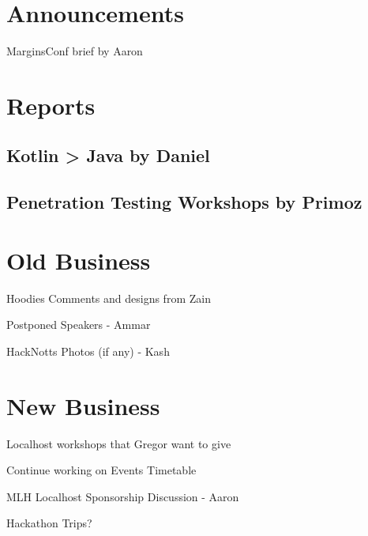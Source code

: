 \documentclass[11pt,hacksoc,agenda]{meetingmins}
\begin{document}
\maketitle

\section{Announcements}
\begin{items}
	\item
	MarginsConf brief by Aaron

\end{items}

\section{Reports}

\subsection{Kotlin > Java by Daniel}
\begin{hiddensubitems}
\item
\end{hiddensubitems}

\subsection{Penetration Testing Workshops by Primoz}
\begin{hiddensubitems}
\item
\end{hiddensubitems}

\section{Old Business}
\begin{items}
	\item
	Hoodies
		\subitem
		Comments and designs from Zain
		
	\item
	Postponed Speakers - Ammar
	
	\item
	HackNotts Photos (if any) - Kash
\end{items}

\section{New Business}
\begin{items}
	\item
	Localhost workshops that Gregor want to give
	
	\item
	Continue working on Events Timetable
	
	\item
	MLH Localhost Sponsorship Discussion - Aaron
	
	\item
	Hackathon Trips?
	
\end{items}

\vspace{1em}
\nextmeeting{}
\end{document}
